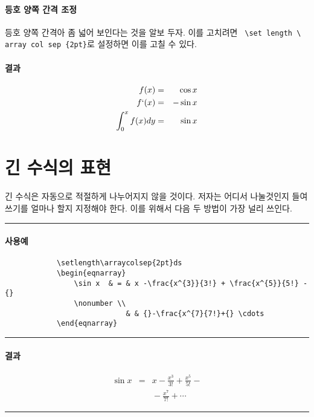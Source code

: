 \documentclass[12pt,a4paper]{report}
\begin{document}
		\paragraph{등호 양쪽 간격 조정}
		등호 양쪽 간격아 좀 넓어 보인다는 것을 알보 두자. 이를 고치려면 \verb| \set length \ array col sep {2pt}|로 설정하면 이를 고칠 수 있다.
		
	
		\paragraph{결과}
		\setlength\arraycolsep{2pt}
		\begin{eqnarray}
			f(x) & = & \cos x \\
			f`(x) & = & - \sin x \\
			\int_{0}^{x} f(x) dy & = & \sin x 
		\end{eqnarray}
		
%
%
%
\clearpage
\section{긴 수식의 표현}


	긴 수식은 자동으로 적절하게 나누어지지 않을 것이다. 
	저자는 어디서 나눌것인지 들여쓰기를 얼마나 할지 지정해야 한다. 
	이를 위해서 다음 두 방법이 가장 널리 쓰인다.
	\\
		\rule{\linewidth}{1pt}
		\paragraph{사용예}
		\begin{verbatim}
			\setlength\arraycolsep{2pt}ds
			\begin{eqnarray}
			    \sin x 	& = & x -\frac{x^{3}}{3!} + \frac{x^{5}}{5!} - {}
			    \nonumber \\
					    	& & {}-\frac{x^{7}{7!}+{} \cdots
			\end{eqnarray}
		\end{verbatim}
		\rule{\linewidth}{1pt}
		\paragraph{결과}
			\setlength\arraycolsep{2pt}
			\begin{eqnarray}
			    \sin x 	& = & x -\frac{x^{3}}{3!} + \frac{x^{5}}{5!} - {}
			    \nonumber \\
					 	& & {}-\frac{x^{7}}{7!}+{} \cdots
			\end{eqnarray}
		\rule{\linewidth}{1pt}
	
\end{document}
